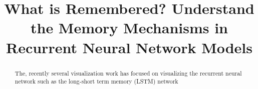\documentclass{egpubl}
\title{What is Remembered? Understand the Memory Mechanisms in Recurrent Neural Network Models}
\begin{document}
\maketitle

\begin{abstract}
The, recently several visualization work has focused on visualizing the recurrent neural network such as the long-short term memory (LSTM) network
\end{abstract}





\end{document}
